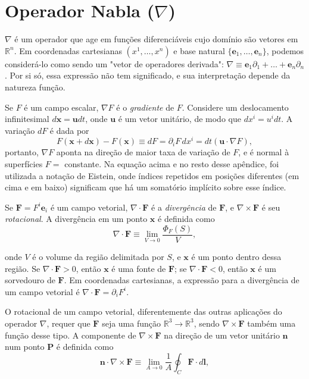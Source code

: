 \section{Operador Nabla ($\nabla$)}
$\nabla$ é um operador que age em funções diferenciáveis cujo domínio são vetores em $\mathbb{R}^n$. Em coordenadas cartesianas $(x^1, \dots , x^n)$ e base natural $\{\mathbf{e}_1, \dots, \mathbf{e}_n\}$, podemos considerá-lo como sendo um "vetor de operadores derivada":  $\nabla \equiv \mathbf{e}_1\partial_1 + \dots + \mathbf{e}_n\partial_n$. Por si só, essa expressão não tem significado, e sua interpretação depende da natureza função.

Se $F$ é um campo escalar, $\nabla F$ é o \textit{gradiente} de $F$. Considere um deslocamento infinitesimal $d\mathbf{x} = \mathbf{u}dt$, onde $\mathbf{u}$ é um vetor unitário, de modo que $dx^i = u^i dt$. A variação $dF$ é dada por
\begin{equation*}
F(\mathbf{x}+ d\mathbf{x}) - F(\mathbf{x}) \equiv dF = \partial_i F \, dx^i = dt(\mathbf u \cdot \nabla F),
\end{equation*}
\noindent portanto, $\nabla F$ aponta na direção de maior taxa de variação de $F$, e é normal à superfícies $F =$ constante. Na equação acima e no resto desse apêndice, foi utilizada a notação de Eistein, onde índices repetidos em posições diferentes (em cima e em baixo) significam que há um somatório implícito sobre esse índice.

Se $\mathbf{F} = F^i \mathbf{e}_i$ é um campo vetorial, $\nabla \cdot \mathbf{F}$ é a \textit{divergência} de $\mathbf{F}
$, e $\nabla \times \mathbf{F}$ é seu \textit{rotacional}. A divergência em um ponto $\mathbf{x}$ é definida como
\begin{equation}
\nabla \cdot \mathbf{F} \equiv \lim\limits_{V \to 0} \frac{\Phi_F(S)}{V} ,
\label{def: div}
\end{equation}

\noindent onde $V$ é o volume da região delimitada por $S$, e $\mathbf{x}$ é um ponto dentro dessa região. Se $\nabla \cdot \mathbf{F} > 0$, então $\mathbf{x}$ é uma fonte de $\mathbf{F}$; se $\nabla \cdot \mathbf{F} < 0$, então $\mathbf{x}$ é um sorvedouro de $\mathbf{F}$. Em coordenadas cartesianas, a expressão para a divergência de um campo vetorial é $\nabla \cdot \mathbf{F} = \partial_i F^i$.

O rotacional de um campo vetorial, diferentemente das outras aplicações do operador $\nabla$, requer que $\mathbf{F}$ seja uma função $\mathbb{R}^3 \to \mathbb{R}^3$, sendo $\nabla \times \mathbf{F}$ também uma função desse tipo. A componente de $\nabla \times \mathbf{F}$ na direção de um vetor unitário $\mathbf{n}$ num ponto $\mathbf{P}$ é definida como
\begin{equation}
\mathbf{n} \cdot \nabla \times \mathbf{F} \equiv \lim\limits_{A \to 0} \frac{1}{A} \oint_C \mathbf{F} \cdot d\mathbf{l},
\label{def: rot}
\end{equation}

